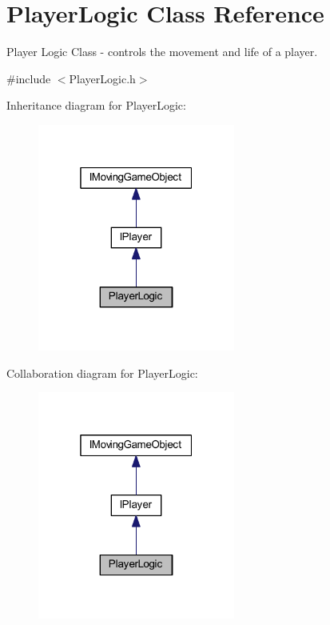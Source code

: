 \hypertarget{class_player_logic}{}\section{Player\+Logic Class Reference}
\label{class_player_logic}


Player Logic Class -\/ controls the movement and life of a player.  




{\ttfamily \#include $<$Player\+Logic.\+h$>$}



Inheritance diagram for Player\+Logic\+:\nopagebreak
\begin{figure}[H]
\begin{center}
\leavevmode
\includegraphics[width=184pt]{class_player_logic__inherit__graph}
\end{center}
\end{figure}


Collaboration diagram for Player\+Logic\+:\nopagebreak
\begin{figure}[H]
\begin{center}
\leavevmode
\includegraphics[width=184pt]{class_player_logic__coll__graph}
\end{center}
\end{figure}
